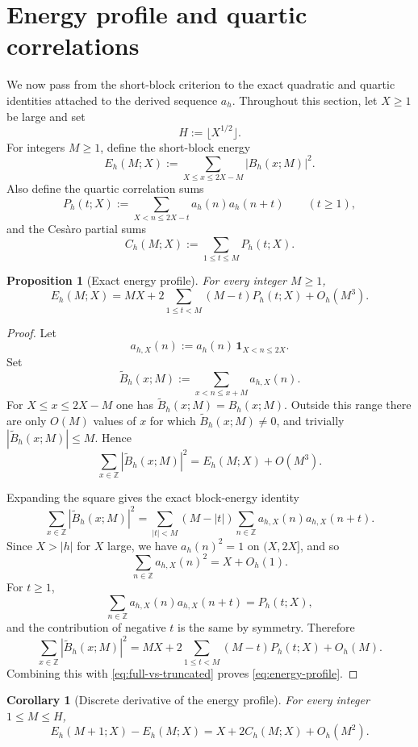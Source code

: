 \documentclass[11pt]{scrartcl}
\numberwithin{equation}{section}
\newtheorem{proposition}[theorem]{Proposition}
\newtheorem{corollary}[theorem]{Corollary}
\theoremstyle{definition}
\newcommand{\Z}{\mathbb Z}
\newcommand{\1}{\mathbf 1}
\newcommand{\abs}[1]{\left|#1\right|}
\begin{document}
\section{Energy profile and quartic correlations}
\label{sec:energy-profile}

We now pass from the short-block criterion to the exact quadratic and quartic identities attached to the derived sequence $a_h$. Throughout this section, let $X\ge 1$ be large and set
\[
H:=\lfloor X^{1/2}\rfloor.
\]
For integers $M\ge 1$, define the short-block energy
\[
E_h(M;X):=\sum_{X\le x\le 2X-M}\abs{B_h(x;M)}^2.
\]
Also define the quartic correlation sums
\[
P_h(t;X):=\sum_{X<n\le 2X-t}a_h(n)a_h(n+t)
\qquad (t\ge 1),
\]
and the Ces\`aro partial sums
\[
C_h(M;X):=\sum_{1\le t\le M}P_h(t;X).
\]

\begin{proposition}[Exact energy profile]
\label{prop:energy-profile}
For every integer $M\ge 1$,
\begin{equation}
\label{eq:energy-profile}
E_h(M;X)=MX+2\sum_{1\le t<M}(M-t)P_h(t;X)+O_h(M^3).
\end{equation}
\end{proposition}

\begin{proof}
Let
\[
a_{h,X}(n):=a_h(n)\,\mathbf 1_{X<n\le 2X}.
\]
Set
\[
\widetilde B_h(x;M):=\sum_{x<n\le x+M}a_{h,X}(n).
\]
For $X\le x\le 2X-M$ one has $\widetilde B_h(x;M)=B_h(x;M)$. Outside this range there are only $O(M)$ values of $x$ for which $\widetilde B_h(x;M)\neq 0$, and trivially $\abs{\widetilde B_h(x;M)}\le M$. Hence
\begin{equation}
\label{eq:full-vs-truncated}
\sum_{x\in\Z}\abs{\widetilde B_h(x;M)}^2=E_h(M;X)+O(M^3).
\end{equation}

Expanding the square gives the exact block-energy identity
\[
\sum_{x\in\Z}\abs{\widetilde B_h(x;M)}^2
=
\sum_{|t|<M}(M-|t|)\sum_{n\in\Z}a_{h,X}(n)a_{h,X}(n+t).
\]
Since $X>|h|$ for $X$ large, we have $a_h(n)^2=1$ on $(X,2X]$, and so
\[
\sum_{n\in\Z}a_{h,X}(n)^2=X+O_h(1).
\]
For $t\ge 1$,
\[
\sum_{n\in\Z}a_{h,X}(n)a_{h,X}(n+t)=P_h(t;X),
\]
and the contribution of negative $t$ is the same by symmetry. Therefore
\[
\sum_{x\in\Z}\abs{\widetilde B_h(x;M)}^2
=MX+2\sum_{1\le t<M}(M-t)P_h(t;X)+O_h(M).
\]
Combining this with \eqref{eq:full-vs-truncated} proves \eqref{eq:energy-profile}.
\end{proof}

\begin{corollary}[Discrete derivative of the energy profile]
\label{cor:discrete-derivative}
For every integer $1\le M\le H$,
\begin{equation}
\label{eq:discrete-derivative}
E_h(M+1;X)-E_h(M;X)=X+2C_h(M;X)+O_h(M^2).
\end{equation}
\end{corollary}
\end{document}
